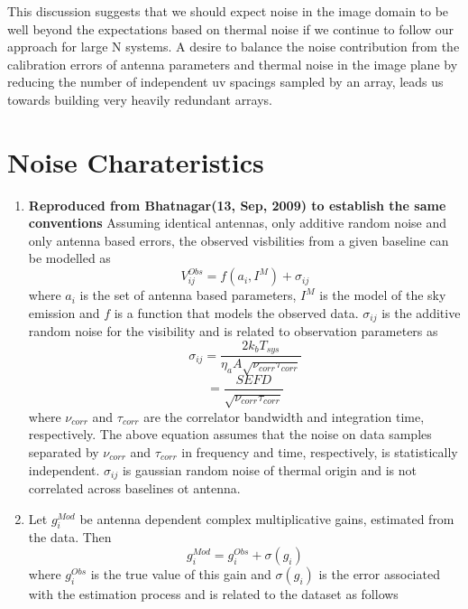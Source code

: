 \documentclass[11pt]{article}
\begin{document}
This discussion suggests that we should expect noise in the image domain to be well beyond the expectations based on thermal noise if we continue to follow our approach for large N systems.
A desire to balance the noise contribution from the calibration errors of antenna parameters and thermal noise in the image plane by reducing the number of independent uv spacings sampled by an array, leads us towards building very heavily redundant arrays.

\section{Noise Charateristics}
\begin{enumerate}
\item {\bf Reproduced from Bhatnagar(13, Sep, 2009) to establish the same conventions} Assuming identical antennas, only additive random noise and only antenna based errors, the observed visbilities from a given baseline can be modelled as
\begin{equation}
V_{ij}^{Obs} = f({a_i}, I^M) + \sigma_{ij}
\end{equation}
where ${a_i}$ is the set of antenna based parameters, $I^M$ is the model of the sky emission and $f$ is a function that models the observed data.
$\sigma_{ij}$ is the additive random noise for the visibility and is related to observation parameters as
\begin{equation}
\sigma_{ij} = \frac {2 k_b T_{sys}} {\eta_a A \sqrt{\nu_{corr} \tau_{corr}}}
\end{equation}
\begin{equation}
= \frac {SEFD} {\sqrt{\nu_{corr} \tau_{corr}}}
\label{E-sigma_ij-def}
\end{equation}
where $\nu_{corr}$ and $\tau_{corr}$ are the correlator bandwidth and integration time, respectively.
The above equation assumes that the noise on data samples separated by $\nu_{corr}$ and $\tau_{corr}$ in frequency and time, respectively, is statistically independent.
$\sigma_{ij}$ is gaussian random noise of thermal origin and is not correlated across baselines ot antenna.
\item Let $g_i^{Mod}$ be antenna dependent complex multiplicative gains, estimated from the data. Then
\begin{equation}
g_i^{Mod} = g_{i}^{Obs} + \sigma(g_i)
\end{equation}
where $g_i^{Obs}$ is the true value of this gain and $\sigma(g_i)$ is the error associated with the estimation process and is related to the dataset as follows

\end{enumerate}
\end{document}
